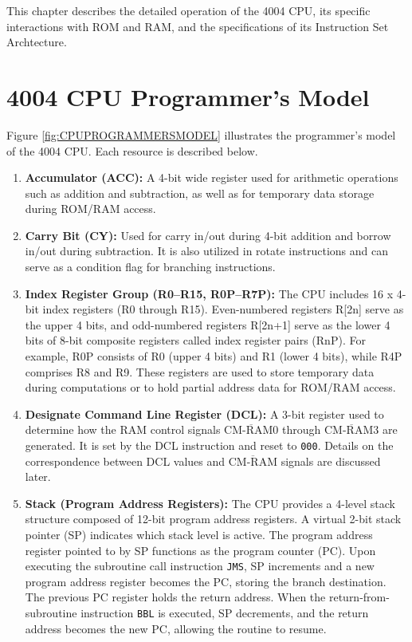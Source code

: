 This chapter describes the detailed operation of the 4004 CPU, its specific interactions with ROM and RAM, and the specifications of its Instruction Set Archtecture.
\section{4004 CPU Programmer's Model}
Figure \ref{fig:CPUPROGRAMMERSMODEL} illustrates the programmer's model of the 4004 CPU. Each resource is described below.

\begin{enumerate}
  \item \textbf{Accumulator (ACC):} A 4-bit wide register used for arithmetic operations such as addition and subtraction, as well as for temporary data storage during ROM/RAM access.

  \item \textbf{Carry Bit (CY):} Used for carry in/out during 4-bit addition and borrow in/out during subtraction. It is also utilized in rotate instructions and can serve as a condition flag for branching instructions.

  \item \textbf{Index Register Group (R0--R15, R0P--R7P):} The CPU includes 16 x 4-bit index registers (R0 through R15). Even-numbered registers R[2n] serve as the upper 4 bits, and odd-numbered registers R[2n+1] serve as the lower 4 bits of 8-bit composite registers called index register pairs (RnP). For example, R0P consists of R0 (upper 4 bits) and R1 (lower 4 bits), while R4P comprises R8 and R9. These registers are used to store temporary data during computations or to hold partial address data for ROM/RAM access.

  \item \textbf{Designate Command Line Register (DCL):} A 3-bit register used to determine how the RAM control signals $\overline{\text{CM-RAM0}}$ through $\overline{\text{CM-RAM3}}$ are generated. It is set by the DCL instruction and reset to \texttt{000}. Details on the correspondence between DCL values and $\overline{\text{CM-RAM}}$ signals are discussed later.

  \item \textbf{Stack (Program Address Registers):} The CPU provides a 4-level stack structure composed of 12-bit program address registers. A virtual 2-bit stack pointer (SP) indicates which stack level is active. The program address register pointed to by SP functions as the program counter (PC). Upon executing the subroutine call instruction \texttt{JMS}, SP increments and a new program address register becomes the PC, storing the branch destination. The previous PC register holds the return address. When the return-from-subroutine instruction \texttt{BBL} is executed, SP decrements, and the return address becomes the new PC, allowing the routine to resume.
\end{enumerate}

